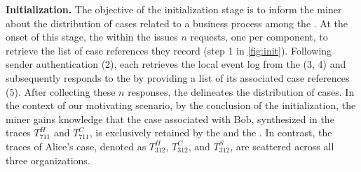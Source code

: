 \noindent\textbf{Initialization.} The objective of the initialization stage is to inform the miner about the distribution of cases related to a business process among the . At the onset of this stage, the  within the  issues $n$ requests, one per  component, %
to retrieve the list of case references they record (step 1 in \cref{fig:init}). Following sender authentication (2), each  retrieves the local event log from the  (3, 4) and subsequently responds to the  by providing a list of its associated case references (5). After collecting these $n$ responses, the  delineates the distribution of cases. In the context of our motivating scenario, by the conclusion of the initialization, the miner gains knowledge that the case associated with Bob, synthesized in the traces $T^H_{711}$ and $T^C_{711}$, is exclusively retained by the  and the . In contrast, the traces of Alice's case, denoted as $T^H_{312}$, $T^C_{312}$, and $T^S_{312}$, are scattered across all three organizations.

